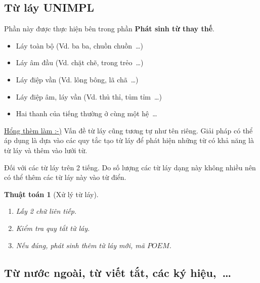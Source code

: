 \documentclass[a4paper,oneside]{book} %
\newcommand{\note}[1]{\underline{#1}}
\theoremstyle{break}
\newtheorem{algo}{Thuật toán}
\begin{document}
\subsection{Từ láy UNIMPL}

Phần này được thực hiện bên trong phần \textbf{Phát sinh từ thay thế}.

\begin{itemize}
\item Láy toàn bộ (Vd. ba ba, chuồn chuồn~\ldots)
\item Láy âm đầu (Vd. chặt chẽ, trong trẻo~\ldots)
\item Láy điệp vần (Vd. lông bông, lã chã~\ldots)
\item Láy điệp âm, láy vần (Vd. thủ thỉ, tủm tỉm~\ldots)
\item Hai thanh của tiếng thường ở cùng một hệ~\ldots
\end{itemize}

\note{Hổng thèm làm :-)} Vấn đề từ láy cũng tương tự như  tên riêng. Giải
pháp có thể áp dụng là dựa vào các quy tắc tạo từ láy để phát hiện
những từ có khả năng là từ láy và thêm vào lưới từ. 

Đối với các từ láy trên 2 tiếng. Do số lượng các từ láy dạng này không
nhiều nên có thể thêm các từ láy này vào từ điển.

\begin{algo}[Xử lý từ láy]
\label{algo:poem}
  \begin{enumerate}
  \item Lấy 2 chữ liên tiếp.
  \item Kiểm tra quy tắt từ láy.
  \item Nếu đúng, phát sinh thêm từ láy mới, mã $POEM$.
  \end{enumerate}
\end{algo}


\subsection{Từ nước ngoài, từ viết tắt, các ký hiệu,~\ldots}
\end{document}
